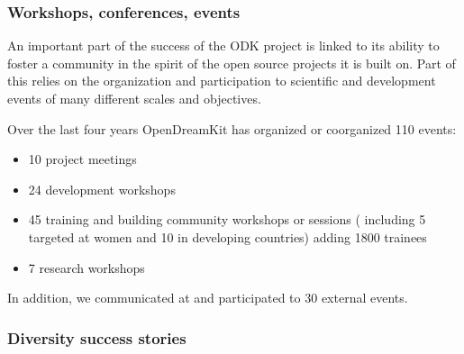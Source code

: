 \subsubsection{Workshops, conferences, events}


An important part of the success of the ODK project is linked to its
ability to foster a community in the spirit of the open source
projects it is built on. Part of this relies on the organization and
participation to scientific and development events of many different
scales and objectives.

Over the last four years OpenDreamKit has organized or coorganized 110
events:
\begin{itemize}
\item 10 project meetings
\item 24 development workshops
\item 45 training and building community workshops or sessions 
( including 5 targeted at women and 10 in developing countries) adding 1800 trainees
\item 7 research workshops
\end{itemize}
In addition, we communicated at and participated to 30 external events.

\subsubsection{Diversity success stories}
\label{diversity_success_stories}

